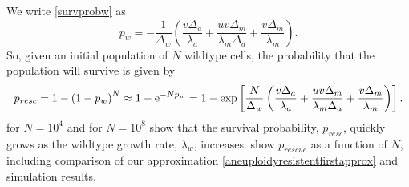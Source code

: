 \documentclass[12pt]{extarticle}
\newcommand{\e}{{\rm e}}
\begin{document}
We write \cref{survprobw} as
\begin{equation}\label{survprobwapprox1}
p_w=-\frac{1}{\Delta_w}\left(\frac{v\Delta_a}{\lambda_a}+\frac{uv\Delta_m}{\lambda_m\Delta_a}+\frac{v\Delta_m}{\lambda_m}\right).
\end{equation}
So, given an initial population of $N$ wildtype cells, the probability that the population will survive is given by
\begin{align}\label{aneuploidyresistentfirstapprox}
p_{resc}=1-\left(1-p_w\right)^N\approx 1-\e^{-Np_w}=1-\exp\left[\frac{N}{\Delta_w}\left(\frac{v\Delta_a}{\lambda_a}+\frac{uv\Delta_m}{\lambda_m\Delta_a}+\frac{v\Delta_m}{\lambda_m}\right)\right] .
\end{align}
 for $N=10^4$ and  for $N=10^8$  show that the survival probability, $p_{resc}$, quickly grows as the wildtype growth rate, $\lambda_w$, increases. %
 show $p_{rescue}$ as a function of $N$, including comparison of our approximation \eqref{aneuploidyresistentfirstapprox} %
and simulation results.
\end{document}
